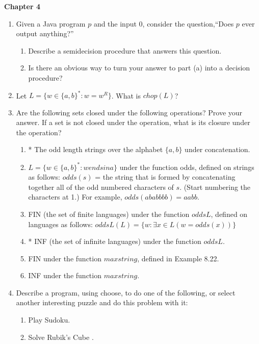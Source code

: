 \documentclass[10pt]{article}
\newcommand{\chtitle}[1]{\noindent \vspace{5mm}\textbf{Chapter #1}\vspace{3mm}}
\begin{document}
\chtitle{4}
\begin{enumerate}


\item
Given a Java program $p$ and the input $0$, consider the question,``Does $p$ ever output anything?''
\begin{enumerate}

\item
Describe a semidecision procedure that answers this question.

\item
Is there an obvious way to turn your answer to part (a) into a decision procedure?
\end{enumerate}


\item
Let $L = \{w \in \{a, b\}^*: w = w^R\}$.  What is $chop(L)$? 


\item
Are the following sets closed under the following operations?  Prove your answer.  If a set is not closed under the operation, what is its closure under the operation?

\begin{enumerate}

\item
* The odd length strings over the alphabet $\{a, b\}$ under concatenation.

\item
$L = \{w \in \{a, b\}^* : w ends in a\}$ under the function odds, defined on strings as follows: $odds(s)$ = the string that is formed by concatenating together all of the odd numbered characters of $s$.  (Start numbering the characters at 1.)  For example, $odds(ababbbb) = aabb$.

\item
FIN (the set of finite languages) under the function $oddsL$, defined on languages as follows: $oddsL(L) = \{w : \exists x \in L (w = odds(x))\}$ 

\item
* INF (the set of infinite languages) under the function $oddsL$.

\item
FIN under the function $maxstring$, defined in Example 8.22.

\item
INF under the function $maxstring$. 
\end{enumerate}


\item
Describe a program, using choose, to do one of the following, or select another interesting puzzle and do this problem with it:
\begin{enumerate}

\item
Play Sudoku.

\item
Solve Rubik's Cube \textregistered .
\end{enumerate}
\end{enumerate}
\end{document}
